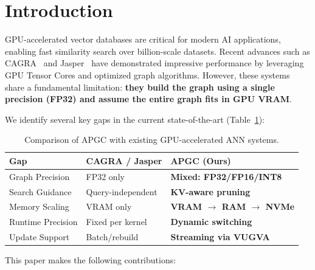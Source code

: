 \documentclass[11pt,twocolumn]{article}
\begin{document}
\section{Introduction}
\label{sec:intro}

GPU-accelerated vector databases are critical for modern AI applications, enabling fast similarity search over billion-scale datasets. Recent advances such as CAGRA~\cite{ootomo2024cagra} and Jasper~\cite{jasper2026} have demonstrated impressive performance by leveraging GPU Tensor Cores and optimized graph algorithms. However, these systems share a fundamental limitation: \textbf{they build the graph using a single precision (FP32) and assume the entire graph fits in GPU VRAM}.

We identify several key gaps in the current state-of-the-art (Table~\ref{tab:gaps}):

\begin{table}[ht]
\centering
\caption{Comparison of APGC with existing GPU-accelerated ANN systems.}
\label{tab:gaps}
\small
\begin{tabular}{p{2.2cm}p{2.5cm}p{2.5cm}}
\toprule
\textbf{Gap} & \textbf{CAGRA / Jasper} & \textbf{APGC (Ours)} \\
\midrule
Graph Precision & FP32 only & \textbf{Mixed: FP32/FP16/INT8} \\
Search Guidance & Query-independent & \textbf{KV-aware pruning} \\
Memory Scaling & VRAM only & \textbf{VRAM $\to$ RAM $\to$ NVMe} \\
Runtime Precision & Fixed per kernel & \textbf{Dynamic switching} \\
Update Support & Batch/rebuild & \textbf{Streaming via VUGVA} \\
\bottomrule
\end{tabular}
\end{table}

This paper makes the following contributions:
\end{document}
